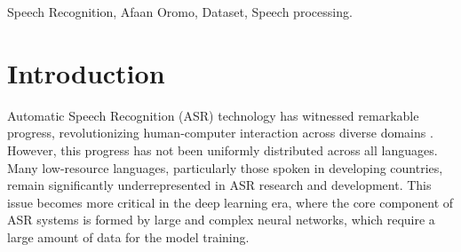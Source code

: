 \documentclass[conference, 9pt]{IEEEtran}
\begin{document}
\begin{IEEEkeywords}
Speech Recognition, Afaan Oromo, Dataset, Speech processing.
\end{IEEEkeywords}

\section{Introduction}
\label{sec:intro}
Automatic Speech Recognition (ASR) technology has witnessed remarkable progress, revolutionizing human-computer interaction across diverse domains \cite{Kheddar_2024, malik2021automatic}. However, this progress has not been uniformly distributed across all languages. Many low-resource languages, particularly those spoken in developing countries, remain significantly underrepresented in ASR research and development. This issue becomes more critical in the deep learning era, where the core component of ASR systems is formed by large and complex neural networks, which require a large amount of data for the model training. 
\end{document}
